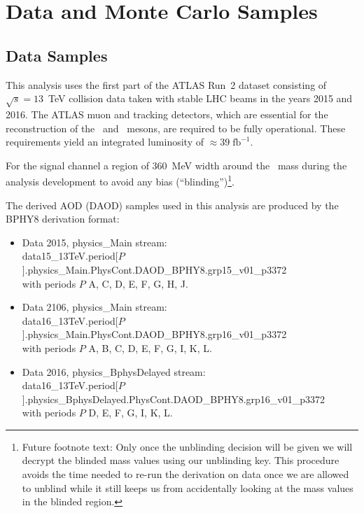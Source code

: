 \section{Data and Monte Carlo Samples}
\label{sec:Samples}

\subsection{Data Samples}
\label{ssec:DataSamples}

This analysis uses the first part of the ATLAS Run~2 dataset
consisting of $\sqrt{s} = 13$~TeV collision data taken with stable LHC
beams in the years 2015 and 2016.  The ATLAS muon and tracking
detectors, which are essential for the reconstruction of the \Bds\ and
\Bpm\ mesons, are required to be fully operational.  These
requirements yield an integrated luminosity of $\approx
39\;\mathrm{fb}^{-1}$.

For the \Bmumu signal channel a region of 360~MeV width around the
\Bs\ mass  during the analysis development to avoid any bias 
(``blinding'')\footnote{Future footnote text: Only once the unblinding
  decision will be given we will decrypt the blinded mass values using
  our unblinding key.  This procedure avoids the time needed to re-run the
  derivation on data once we are allowed to unblind while it still
  keeps us from accidentally looking at the mass values in the
  blinded region.}.

The derived AOD (DAOD) samples used in this analysis are produced
by the BPHY8 derivation format:\skp[10]
\begin{itemize}
\item Data 2015, physics\_Main stream:\\
  data15\_13TeV.period[$P$
  ].physics\_Main.PhysCont.DAOD\_BPHY8.grp15\_v01\_p3372\\
  with periods $P$  A, C, D, E, F, G, H, J.
\item Data 2106, physics\_Main stream:\\
  data16\_13TeV.period[$P$].physics\_Main.PhysCont.DAOD\_BPHY8.grp16\_v01\_p3372\\
  with periods $P$ A, B, C, D, E, F, G, I, K, L.
\item Data 2016, physics\_BphysDelayed stream:\\  
  data16\_13TeV.period[$P$].physics\_BphysDelayed.PhysCont.DAOD\_BPHY8.grp16\_v01\_p3372
  \\
  with periods $P$ D, E, F, G, I, K, L.
\end{itemize}


